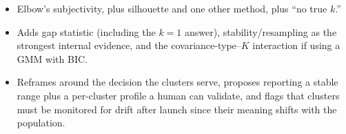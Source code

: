 \begin{interviewq}

\goodgreat
\begin{itemize}
    \item {} Elbow's subjectivity, plus silhouette and one other method, plus ``no true $k$.''
    \item {} Adds gap statistic (including the $k=1$ answer), stability/resampling as the strongest internal evidence, and the covariance-type--$K$ interaction if using a GMM with BIC.
    \item {} Reframes around the decision the clusters serve, proposes reporting a stable range plus a per-cluster profile a human can validate, and flags that clusters must be monitored for drift after launch since their meaning shifts with the population.
\end{itemize}

\end{interviewq}

